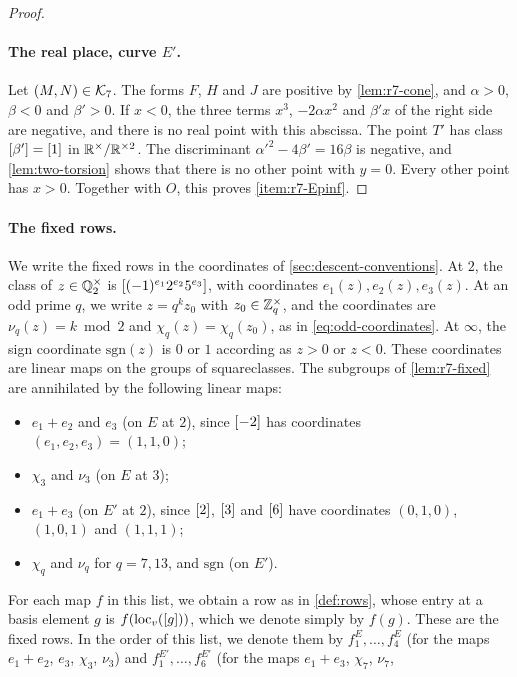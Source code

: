 \begin{proof}
\paragraph{The real place, curve $E'$.}
Let $(M,N)\in\mathcal K_7$. The forms $F$, $H$ and $J$ are positive by
\cref{lem:r7-cone}, and $\alpha>0$, $\beta<0$ and $\beta'>0$. If $x<0$, the three terms
$x^3$, $-2\alpha x^2$ and $\beta'x$ of the right side are negative, and
there is no real point with this abscissa. The point $T'$ has class
$[\beta']=[1]$ in $\mathbb R^{\times}/\mathbb R^{\times2}$. The discriminant $\alpha'^2-4\beta'=16\beta$
is negative, and \cref{lem:two-torsion} shows that there is no other point
with $y=0$. Every
other point has $x>0$. Together with $O$, this proves \ref{item:r7-Epinf}.
\end{proof}

\paragraph{The fixed rows.}
We write the fixed rows in the coordinates of
\cref{sec:descent-conventions}. At $2$, the class of $z\in\mathbb Q_2^\times$ is
$[(-1)^{e_1}2^{e_2}5^{e_3}]$, with coordinates $e_1(z),e_2(z),e_3(z)$.
At an odd prime $q$, we write $z=q^kz_0$ with $z_0\in\mathbb Z_q^\times$, and the
coordinates are $\nu_q(z)=k\bmod2$ and $\chi_q(z)=\chi_q(z_0)$, as in
\eqref{eq:odd-coordinates}. At $\infty$, the sign coordinate
$\mathrm{sgn}(z)$ is $0$ or $1$ according as $z>0$ or $z<0$. These coordinates are linear maps on the groups of
squareclasses. The subgroups of \cref{lem:r7-fixed} are annihilated by the
following linear maps:
\begin{itemize}
\item $e_1+e_2$ and $e_3$ (on $E$ at $2$), since $[-2]$ has coordinates
$(e_1,e_2,e_3)=(1,1,0)$;
\item $\chi_3$ and $\nu_3$ (on $E$ at $3$);
\item $e_1+e_3$ (on $E'$ at $2$), since $[2]$, $[3]$ and $[6]$ have
coordinates $(0,1,0)$, $(1,0,1)$ and $(1,1,1)$;
\item $\chi_q$ and $\nu_q$ for $q=7,13$, and $\mathrm{sgn}$ (on $E'$).
\end{itemize}
For each map $f$ in this list, we obtain a row as in \cref{def:rows}, whose
entry at a basis element $g$ is $f(\operatorname{loc}_v([g]))$, which we
denote simply by $f(g)$. These are the fixed rows. In the order of this list, we denote them by
$f^E_1,\dots,f^E_4$ (for the maps $e_1+e_2$, $e_3$, $\chi_3$, $\nu_3$) and
$f^{E'}_1,\dots,f^{E'}_6$ (for the maps $e_1+e_3$, $\chi_7$, $\nu_7$,
